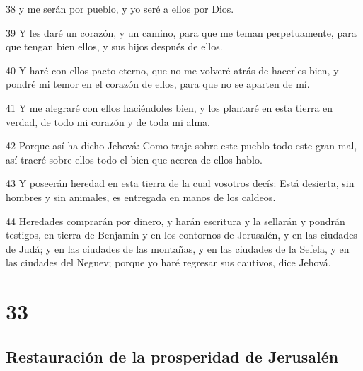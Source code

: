 \par 38 y me serán por pueblo, y yo seré a ellos por Dios.
\par 39 Y les daré un corazón, y un camino, para que me teman perpetuamente, para que tengan bien ellos, y sus hijos después de ellos.
\par 40 Y haré con ellos pacto eterno, que no me volveré atrás de hacerles bien, y pondré mi temor en el corazón de ellos, para que no se aparten de mí.
\par 41 Y me alegraré con ellos haciéndoles bien, y los plantaré en esta tierra en verdad, de todo mi corazón y de toda mi alma.
\par 42 Porque así ha dicho Jehová: Como traje sobre este pueblo todo este gran mal, así traeré sobre ellos todo el bien que acerca de ellos hablo.
\par 43 Y poseerán heredad en esta tierra de la cual vosotros decís: Está desierta, sin hombres y sin animales, es entregada en manos de los caldeos.
\par 44 Heredades comprarán por dinero, y harán escritura y la sellarán y pondrán testigos, en tierra de Benjamín y en los contornos de Jerusalén, y en las ciudades de Judá; y en las ciudades de las montañas, y en las ciudades de la Sefela, y en las ciudades del Neguev; porque yo haré regresar sus cautivos, dice Jehová.

\chapter{33}

\section*{Restauración de la prosperidad de Jerusalén}

